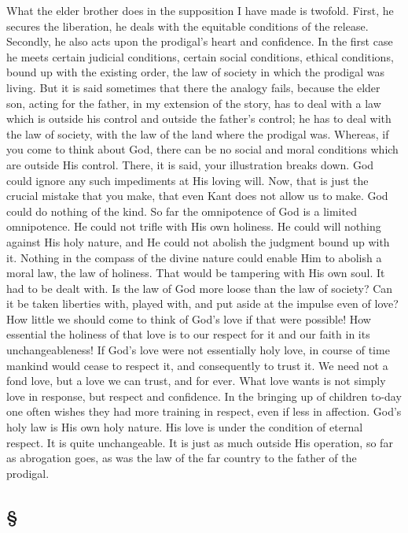 \documentclass[draft]{ptfdoc}
\begin{document}
What the elder brother does in the supposition
I have made is twofold. First, he secures 
the liberation, he deals with the equitable conditions 
of the release. Secondly, he also acts upon 
the prodigal's heart and confidence. In the first 
case he meets certain judicial conditions, certain 
social conditions, ethical conditions, bound 
up with the existing order, the law of society 
in which the prodigal was living. But it is 
said sometimes that there the analogy fails, 
because the elder son, acting for the father, 
in my extension of the story, has to deal with 
a law which is outside his control and outside 
the father's control; he has to deal with the 
law of society, with the law of the land where 
the prodigal was. Whereas, if you come to 
think about God, there can be no social and 
moral conditions which are outside His control. 
There, it is said, your illustration breaks down. 
God could ignore any such impediments at 
His loving will. Now, that is just the crucial 
mistake that you make, that even Kant does 
not allow us to make. God could do nothing 
of the kind. So far the omnipotence of God is 
a limited omnipotence. He could not trifle with 
His own holiness. He could will nothing against 
His holy nature, and He could not abolish the 
judgment bound up with it. Nothing in the 
compass of the divine nature could enable Him 
to abolish a moral law, the law of holiness. That 
would be tampering with His own soul. It had 
to be dealt with. Is the law of God more loose 
than the law of society? Can it be taken liberties 
with, played with, and put aside at the 
impulse even of love? How little we should 
come to think of God's love if that were possible! 
How essential the holiness of that love is to 
our respect for it and our faith in its unchangeableness! 
If God's love were not essentially 
holy love, in course of time mankind would 
cease to respect it, and consequently to trust 
it. We need not a fond love, but a love we 
can trust, and for ever. What love wants is not 
simply love in response, but respect and confidence. 
In the bringing up of children to-day 
one often wishes they had more training in 
respect, even if less in affection. God's holy 
law is His own holy nature. His love is under 
the condition of eternal respect. It is quite 
unchangeable. It is just as much outside His 
operation, so far as abrogation goes, as was 
the law of the far country to the father of 
the prodigal. 

\subsection*{
\S
}
\end{document}

